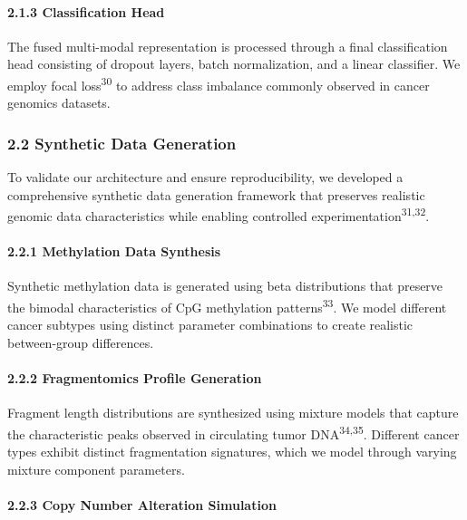\paragraph{2.1.3 Classification Head}\label{classification-head}

The fused multi-modal representation is processed through a final
classification head consisting of dropout layers, batch normalization,
and a linear classifier. We employ focal loss\textsuperscript{30} to
address class imbalance commonly observed in cancer genomics datasets.

\subsubsection{2.2 Synthetic Data
Generation}\label{synthetic-data-generation}

To validate our architecture and ensure reproducibility, we developed a
comprehensive synthetic data generation framework that preserves
realistic genomic data characteristics while enabling controlled
experimentation\textsuperscript{31,32}.

\paragraph{2.2.1 Methylation Data
Synthesis}\label{methylation-data-synthesis}

Synthetic methylation data is generated using beta distributions that
preserve the bimodal characteristics of CpG methylation
patterns\textsuperscript{33}. We model different cancer subtypes using
distinct parameter combinations to create realistic between-group
differences.

\paragraph{2.2.2 Fragmentomics Profile
Generation}\label{fragmentomics-profile-generation}

Fragment length distributions are synthesized using mixture models that
capture the characteristic peaks observed in circulating tumor
DNA\textsuperscript{34,35}. Different cancer types exhibit distinct
fragmentation signatures, which we model through varying mixture
component parameters.

\paragraph{2.2.3 Copy Number Alteration
Simulation}\label{copy-number-alteration-simulation}

